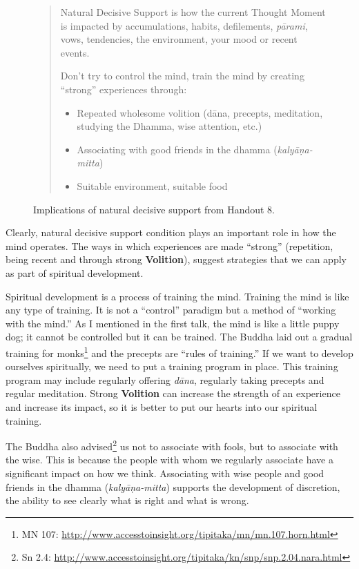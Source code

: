 \begin{figure}[H]
\begin{quotation}
Natural Decisive Support is how the current Thought Moment is impacted by accumulations, habits, defilements, \textit{pārami}, vows, tendencies, the environment, your mood or recent events.

Don’t try to control the mind, train the mind by creating “strong” experiences through:

\begin{itemize}

\item Repeated wholesome volition (dāna, precepts, meditation, studying the Dhamma, wise attention, etc.)

\item Associating with good friends in the dhamma (\textit{kalyāṇa-mitta})

\item Suitable environment, suitable food

\end{itemize}
\end{quotation}
\caption{Implications of natural decisive support from Handout 8.}
\label{fig:Implications}
\end{figure}

Clearly, natural decisive support condition plays an important role in how the mind operates. The ways in which experiences are made “strong” (repetition, being recent and through strong \textbf{Volition}), suggest strategies that we can apply as part of spiritual development.

Spiritual development is a process of training the mind. Training the mind is like any type of training. It is not a “control” paradigm but a method of “working with the mind.” As I mentioned in the first talk, the mind is like a little puppy dog; it cannot be controlled but it can be trained. The Buddha laid out a gradual training for monks\footnote{MN 107: \url{http://www.accesstoinsight.org/tipitaka/mn/mn.107.horn.html}} and the precepts are “rules of training.” If we want to develop ourselves spiritually, we need to put a training program in place. This training program may include regularly offering \textit{dāna}, regularly taking precepts and regular meditation. Strong \textbf{Volition} can increase the strength of an experience and increase its impact, so it is better to put our hearts into our spiritual training.

The Buddha also advised\footnote{Sn 2.4: \url{http://www.accesstoinsight.org/tipitaka/kn/snp/snp.2.04.nara.html}} us not to associate with fools, but to associate with the wise. This is because the people with whom we regularly associate have a significant impact on how we think. Associating with wise people and good friends in the dhamma (\textit{kalyāṇa-mitta}) supports the development of discretion, the ability to see clearly what is right and what is wrong.

